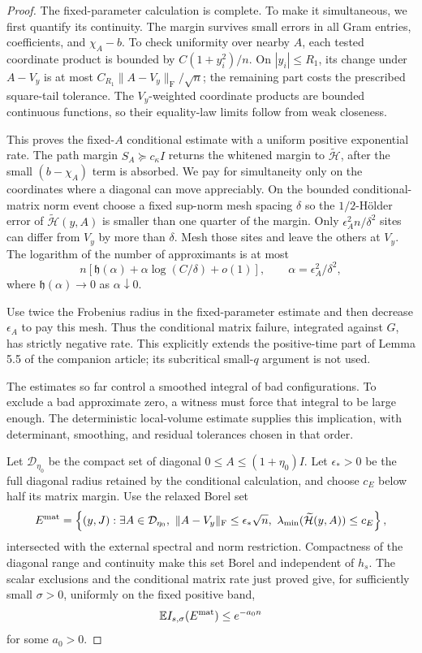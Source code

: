 \begin{proof}
The fixed-parameter calculation is complete. To make it simultaneous,
we first quantify its continuity. The margin survives small errors in
all Gram entries, coefficients,
and $\chi_A-b$.  To check uniformity over nearby $A$, each tested
coordinate product is bounded by $C(1+y_i^2)/n$.  On $|y_i|\le R_1$,
its change under $A-V_y$ is at most
$C_{R_1}\|A-V_y\|_{\mathrm F}/\sqrt n$; the remaining part costs the
prescribed square-tail tolerance.  The $V_y$-weighted coordinate
products are bounded continuous functions, so their equality-law
limits follow from weak closeness.

This proves the fixed-$A$
conditional estimate with a uniform positive exponential rate.
The path margin \(S_A\succeq c_\kappa I\) returns the whitened
margin to \(\widetilde{\mathcal H}\), after the small
\((b-\chi_A)\) term is absorbed.
We pay for simultaneity only on the coordinates where a diagonal can
move appreciably. On the bounded conditional-matrix norm event choose
a fixed sup-norm mesh spacing $\delta$ so the $1/2$-H\"older error of
$\widetilde{\mathcal H}(y,A)$ is smaller than one quarter of the margin. Only
$\epsilon_A^2n/\delta^2$ sites can differ from $V_y$ by more than
$\delta$.  Mesh those sites and leave the others at $V_y$.
The logarithm of the number of approximants is at most
\[
 n\left[\mathfrak h(\alpha)+\alpha\log(C/\delta)+o(1)\right],
 \qquad \alpha=\epsilon_A^2/\delta^2,
\]
where $\mathfrak h(\alpha)\to0$ as $\alpha\downarrow0$.

Use twice the Frobenius radius in the fixed-parameter estimate and
then decrease $\epsilon_A$ to pay this mesh.  Thus the conditional
matrix failure, integrated against $G$, has strictly negative rate.
This explicitly extends the positive-time part of Lemma 5.5 of the
companion article; its subcritical small-$q$ argument is not used.

The estimates so far control a smoothed integral of bad configurations.
To exclude a bad approximate zero, a witness must force that integral
to be large enough. The deterministic local-volume estimate supplies
this implication, with determinant, smoothing, and residual tolerances
chosen in that order.

Let \(\mathcal D_{\eta_0}\) be the compact set of diagonal
\(0\le A\le(1+\eta_0)I\). Let \(\epsilon_*>0\) be the full
diagonal radius retained by the conditional calculation, and choose
\(c_E\) below half its matrix margin. Use the relaxed Borel set
\[
 E^{\rm mat}=\left\{(y,J):\exists A\in\mathcal D_{\eta_0},\
 \|A-V_y\|_{\rm F}\le\epsilon_*\sqrt n,\
 \lambda_{\min}(\widetilde{\mathcal H}(y,A))\le c_E\right\},
\]
intersected with the external spectral and norm restriction.
Compactness of the diagonal range and continuity make this set
Borel and independent of \(h_s\). The scalar exclusions and the
conditional matrix rate just proved give, for sufficiently small
\(\sigma>0\), uniformly on the fixed positive band,
\[
 \mathbb E I_{s,\sigma}(E^{\rm mat})\le e^{-a_0n}
\]
for some \(a_0>0\).


\end{proof}
